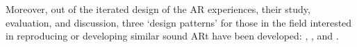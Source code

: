 \begin{SingleSpace}
    Moreover, out of the iterated design of the AR experiences, their study, evaluation, and discussion, three `design patterns' for those in the field interested in reproducing or developing similar sound ARt have been developed: \textit{\hyperref[sec: discussion-patterns-experience]{}}, \textit{\hyperref[sec: discussion-patterns-instrument]{}}, and \textit{\hyperref[sec: discussion-patterns-environment]{}}.   
\end{SingleSpace}
\acresetall